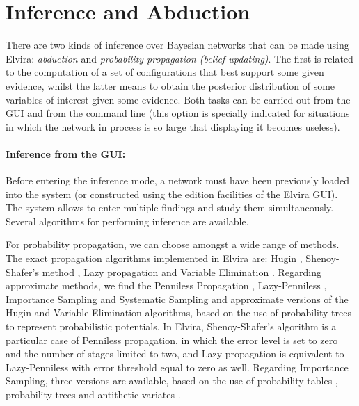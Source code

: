 \section{Inference and Abduction}

There are two kinds of inference over Bayesian networks that can
be made using Elvira: {\em abduction} and {\em probability
propagation (belief updating)}. The first is related to the
computation of a set of configurations that best support some given
evidence, whilst the latter means to obtain the posterior
distribution of some variables of interest given some evidence.
Both tasks can be carried out from the GUI and from the command
line (this option is specially indicated for situations in which
the network in process is so large that displaying it becomes
useless).

\paragraph{Inference from the GUI:}
Before entering the inference mode, a network must have been
previously loaded into the system (or constructed using the edition
facilities of the Elvira GUI). The system allows to enter multiple
findings and study them simultaneously. Several algorithms for
performing inference are available.

For probability propagation, we can choose amongst a wide range of
methods. The exact propagation algorithms implemented in Elvira
are: Hugin \cite{Jen90}, Shenoy-Shafer's method \cite{She97}, Lazy
propagation \cite{Mad99} and Variable Elimination \cite{Zha96}.
Regarding approximate methods, we find the Penniless Propagation
\cite{Can00}, Lazy-Penniless \cite{Can02}, Importance Sampling and
Systematic Sampling \cite{Her98} and approximate versions of the
Hugin and Variable Elimination algorithms, based on the use of
probability trees \cite{Cano97} to represent probabilistic
potentials. In Elvira, Shenoy-Shafer's algorithm is a particular
case of Penniless propagation, in which the error level is set to
zero and the number of stages limited to two, and Lazy propagation
is equivalent to Lazy-Penniless with error threshold equal to zero
as well. Regarding Importance Sampling, three versions are
available, based on the use of probability tables \cite{Her98},
probability trees \cite{Sal2000} and antithetic variates
\cite{Sal01}.

